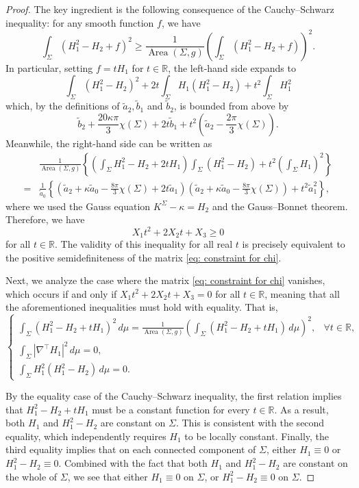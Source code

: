 \documentclass[11pt]{amsart}
\newcommand{\Area}{\operatorname{Area}}
\theoremstyle{definition}
\numberwithin{equation}{section}
\begin{document}
\begin{proof}
    The key ingredient is the following consequence of the Cauchy--Schwarz inequality: for any smooth function $f$, we have
    \[\int_\Sigma(H_1^2-H_2+f)^2\ge \frac{1}{\Area(\Sigma,g)}\left(\int_\Sigma (H_1^2-H_2 + f) \right)^2.\]
    In particular, setting $f = tH_1$ for $t\in\mathbb R$, the left-hand side expands to
    \[
        \int_\Sigma(H_1^2-H_2)^2 + 2t\int_\Sigma H_1(H_1^2-H_2)  + t^2\int_\Sigma H_1^2
    \]
    which, by the definitions of $\tilde a_2, \tilde b_1$ and $\tilde b_2$, is bounded from above by
    \[
        \tilde b_2 + \frac{20\kappa\pi}{3}\chi(\Sigma) + 2t\tilde b_1 + t^2\left(\tilde a_2-\frac{2\pi}{3}\chi(\Sigma)\right).
    \]
    Meanwhile, the right-hand side  can be written as 
    \begin{align*}
        & \frac{1}{\Area(\Sigma,g)}\left\{\left(\int_\Sigma H_1^2-H_2 + 2tH_1\right)\int_\Sigma\left(H_1^2-H_2\right) + t^2\left(\int_\Sigma H_1\right)^2\right\}\\
        = & \frac{1}{\tilde a_0}\left\{\left(\tilde a_2 + \kappa\tilde a_0 - \frac{8\pi}{3}\chi(\Sigma) + 2t\tilde a_1\right)\left(\tilde a_2 + \kappa\tilde a_0 - \frac{8\pi}{3}\chi(\Sigma)\right) + t^2\tilde a_1^2\right\},
    \end{align*}
    where we used the Gauss equation $K^\Sigma - \kappa = H_2$ and the Gauss--Bonnet theorem. Therefore, we have
    \[X_1t^2 + 2X_2t + X_3\ge 0\]
    for all $t\in\mathbb R$. The validity of this inequality for all real $t$ is precisely equivalent to the positive semidefiniteness of the matrix \eqref{eq: constraint for chi}.
    
    Next, we analyze the case where the matrix \eqref{eq: constraint for chi} vanishes, which occurs if and only if $X_1t^2+2X_2t+X_3=0$ for all $t\in\mathbb R$, meaning that all the aforementioned inequalities must hold with equality. That is,
    \[\begin{cases}
    	\int_\Sigma(H_1^2-H_2+tH_1)^2 \, d\mu = \frac{1}{\Area(\Sigma,g)}\left(\int_\Sigma (H_1^2-H_2 + tH_1) \, d\mu \right)^2, & \forall t\in\mathbb R,\\
    	\int_\Sigma |\nabla^\top H_1|^2 \, d\mu = 0,\\
    	\int_{\Sigma}H_1^2(H_1^2 - H_2) \, d\mu = 0.
    \end{cases}\] 
    
    By the equality case of the Cauchy--Schwarz inequality, the first relation implies that $H_1^2 - H_2 + tH_1$ must be a constant function for every $t \in \mathbb{R}$. As a result, both $H_1$ and $H_1^2 - H_2$ are constant on $\Sigma$. This is consistent with the second equality, which independently requires $H_1$ to be locally constant. Finally, the third equality implies that on each connected component of $\Sigma$, either $H_1 \equiv 0$ or $H_1^2 - H_2 \equiv 0$. 
    Combined with the fact that both $H_1$ and $H_1^2 - H_2$ are  constant on the whole of $\Sigma$, we see that either $H_1 \equiv 0$ on $\Sigma$, or $H_1^2 - H_2 \equiv 0$ on $\Sigma$. 
     

\end{proof}
\end{document}

